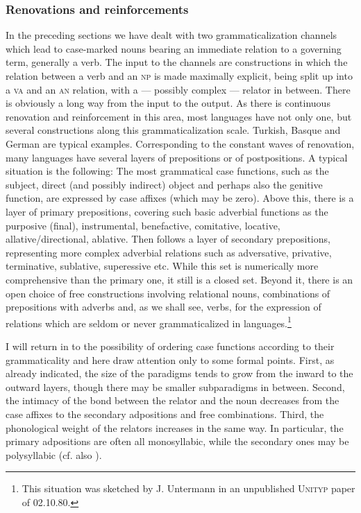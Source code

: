 \subsubsection{Renovations and reinforcements}
In the preceding sections we have dealt with two grammaticalization channels which lead to case-marked nouns bearing an immediate relation to a governing term, generally a verb. The input to the channels are constructions in which the relation between a verb and an \textsc{np} is made maximally explicit, being split up into a \textsc{va} and an \textsc{an} relation, with a — possibly complex — relator in between. There is obviously a long way from the input to the output. As there is continuous renovation and reinforcement in this area, most languages have not only one, but several constructions along this grammaticalization scale. Turkish, Basque and German are typical examples. Corresponding to the constant waves of renovation, many languages have several layers of prepositions or of postpositions.\label{page102} A typical situation is the following: The most grammatical case functions, such as the subject, direct (and possibly indirect) object and perhaps also the genitive function, are expressed by case affixes (which may be zero). Above this, there is a layer of primary prepositions, covering such basic adverbial functions as the purposive (final), instrumental, benefactive, comitative, locative, allative/directional, ablative. Then follows a layer of secondary prepositions, representing more complex adverbial relations such as adversative, privative, terminative, sublative, superessive etc. While this set is numerically more comprehensive than the primary one, it still is a closed set. Beyond it, there is an open choice of free constructions involving relational nouns, combinations of prepositions with adverbs and, as we shall see, verbs, for the expression of relations which are seldom or never grammaticalized in languages.\footnote{This situation was sketched by J. Untermann in an unpublished \textsc{Unityp} paper of 02.10.80.}

I will return in  to the possibility of ordering case functions according to their grammaticality and here draw attention only to some formal points. First, as already indicated, the size of the paradigms tends to grow from the inward to the outward layers, though there may be smaller subparadigms in between. Second, the intimacy of the bond between the relator and the noun decreases from the case affixes to the secondary adpositions and free combinations. Third, the phonological weight of the relators increases in the same way. In particular, the primary adpositions are often all monosyllabic, while the secondary ones may be polysyllabic (cf. also \citealt[138]{Kahr1976}).

